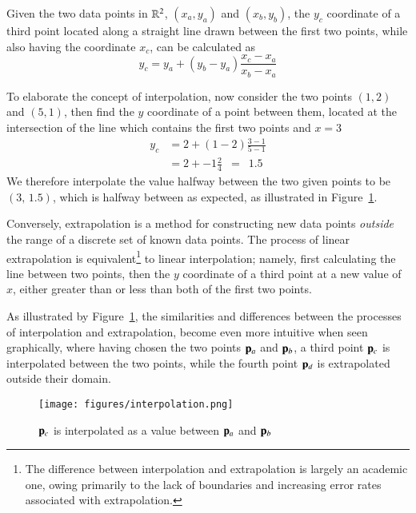 Given the two data points in $\bR{2}$, $(x_a, y_a)$ and $(x_b, y_b)$, the $y_c$ coordinate of a third point located along a straight line drawn between the first two points, while also having the coordinate $x_c$, can be calculated as
%
\begin{equation}
	y_c = y_a + (y_b - y_a) \frac{x_c - x_a}{x_b - x_a}
	\label{eq:interpolationGeneral}
\end{equation}

To elaborate the concept of interpolation, now consider the two points $(1, 2)$ and $(5, 1)$, then find the $y$ coordinate of a point between them, located at the intersection of the line which contains the first two points and $x = 3$
%
\begin{align}
	y_c & = 2 + (1 - 2) \frac{3 - 1}{5 - 1} \\
	& = 2 + -1 \frac{2}{4} \enspace = \enspace  1.5
	\label{eq:interpolationSpecific}
\end{align}
%
We therefore interpolate the value halfway between the two given points to be $(3,\,1.5)$, which is halfway between as expected, as illustrated in Figure~\ref{fig:interpolation}.

Conversely, extrapolation is a method for constructing new data points \textit{outside} the range of a discrete set of known data points. The process of linear extrapolation is equivalent\footnote{The difference between interpolation and extrapolation is largely an academic one, owing primarily to the lack of boundaries and increasing error rates associated with extrapolation.} to linear interpolation; namely, first calculating the line between two points, then the $y$ coordinate of a third point at a new value of $x$, either greater than or less than both of the first two points.

As illustrated by Figure~\ref{fig:interpolation}, the similarities and differences between the processes of interpolation and extrapolation, become even more intuitive when seen graphically, where having chosen the two points $\mathbf{p}_a$ and $\mathbf{p}_b$, a third point $\mathbf{p}_c$ is interpolated between the two points, while the fourth point $\mathbf{p}_d$ is extrapolated outside their domain.

\begin{figure}[ht]
\ffigbox
	{\texttt{[image: figures/interpolation.png]}}
	{\caption[Interpolation between two points in $\bR{2}$]{$\mathbf{p}_c$ is interpolated as a value between $\mathbf{p}_a$ and $\mathbf{p}_b$}\label{fig:interpolation}}
\end{figure}

